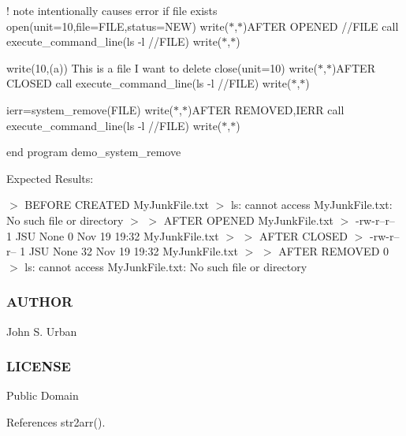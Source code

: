 ! note intentionally causes error if file exists open(unit=10,file=F\+I\+LE,status=\textquotesingle{}N\+EW\textquotesingle{}) write($\ast$,$\ast$)\textquotesingle{}A\+F\+T\+ER O\+P\+E\+N\+ED \textquotesingle{}//\+F\+I\+LE call execute\+\_\+command\+\_\+line(\textquotesingle{}ls -\/l \textquotesingle{}//\+F\+I\+LE) write($\ast$,$\ast$)

write(10,\textquotesingle{}(a)\textquotesingle{}) \textquotesingle{}This is a file I want to delete\textquotesingle{} close(unit=10) write($\ast$,$\ast$)\textquotesingle{}A\+F\+T\+ER C\+L\+O\+S\+ED \textquotesingle{} call execute\+\_\+command\+\_\+line(\textquotesingle{}ls -\/l \textquotesingle{}//\+F\+I\+LE) write($\ast$,$\ast$)

ierr=system\+\_\+remove(\+F\+I\+L\+E) write($\ast$,$\ast$)\textquotesingle{}A\+F\+T\+ER R\+E\+M\+O\+V\+ED\textquotesingle{},I\+E\+RR call execute\+\_\+command\+\_\+line(\textquotesingle{}ls -\/l \textquotesingle{}//\+F\+I\+LE) write($\ast$,$\ast$)

end program demo\+\_\+system\+\_\+remove

Expected Results\+:

$>$ B\+E\+F\+O\+RE C\+R\+E\+A\+T\+ED My\+Junk\+File.\+txt $>$ ls\+: cannot access \textquotesingle{}My\+Junk\+File.\+txt\textquotesingle{}\+: No such file or directory $>$ $>$ A\+F\+T\+ER O\+P\+E\+N\+ED My\+Junk\+File.\+txt $>$ -\/rw-\/r--r-- 1 J\+SU None 0 Nov 19 19\+:32 My\+Junk\+File.\+txt $>$ $>$ A\+F\+T\+ER C\+L\+O\+S\+ED $>$ -\/rw-\/r--r-- 1 J\+SU None 32 Nov 19 19\+:32 My\+Junk\+File.\+txt $>$ $>$ A\+F\+T\+ER R\+E\+M\+O\+V\+ED 0 $>$ ls\+: cannot access \textquotesingle{}My\+Junk\+File.\+txt\textquotesingle{}\+: No such file or directory

\subsubsection*{A\+U\+T\+H\+OR}

John S. Urban \subsubsection*{L\+I\+C\+E\+N\+SE}

Public Domain 

References str2arr().

